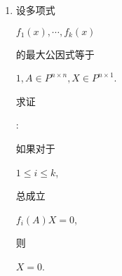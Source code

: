 \documentclass[10pt]{article}
\begin{document}
\begin{enumerate}
  \item \begin{CJK}{UTF8}{mj}设多项式\end{CJK} $f_{1}(x), \cdots, f_{k}(x)$ \begin{CJK}{UTF8}{mj}的最大公因式等于\end{CJK} $1, A \in P^{n \times n}, X \in P^{n \times 1}$. \begin{CJK}{UTF8}{mj}求证\end{CJK}: \begin{CJK}{UTF8}{mj}如果对于\end{CJK} $1 \leqslant i \leqslant k$, \begin{CJK}{UTF8}{mj}总成立\end{CJK} $f_{i}(A) X=0$, \begin{CJK}{UTF8}{mj}则\end{CJK} $X=0$.


\end{enumerate}
\end{document}
